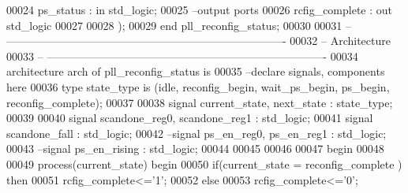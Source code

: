 \begin{DoxyCode}
00024           \textcolor{vhdlchar}{ps_status}             \textcolor{vhdlchar}{:} \textcolor{keywordflow}{in} \textcolor{comment}{std\_logic};
00025 \textcolor{keyword}{        --output ports        }
00026           \textcolor{vhdlchar}{rcfig_complete}        \textcolor{vhdlchar}{:} \textcolor{keywordflow}{out} \textcolor{comment}{std\_logic}
00027           
00028         \textcolor{vhdlchar}{)};
00029 \textcolor{keywordflow}{end} \textcolor{vhdlchar}{pll\_reconfig\_status};
00030 
00031 \textcolor{keyword}{-- ----------------------------------------------------------------------------}
00032 \textcolor{keyword}{-- Architecture}
00033 \textcolor{keyword}{-- ----------------------------------------------------------------------------}
00034 \textcolor{keywordflow}{architecture} arch \textcolor{keywordflow}{of} pll_reconfig_status is
00035 \textcolor{keyword}{--declare signals,  components here}
00036 \textcolor{keywordflow}{type} \textcolor{vhdlchar}{state_type} \textcolor{keywordflow}{is} \textcolor{vhdlchar}{(}\textcolor{vhdlchar}{idle}\textcolor{vhdlchar}{,} \textcolor{vhdlchar}{reconfig\_begin}\textcolor{vhdlchar}{,} \textcolor{vhdlchar}{wait\_ps\_begin}\textcolor{vhdlchar}{,} \textcolor{vhdlchar}{ps\_begin}\textcolor{vhdlchar}{,} \textcolor{vhdlchar}{reconfig\_complete}\textcolor{vhdlchar}{)};
00037 
00038 \textcolor{keywordflow}{signal} \textcolor{vhdlchar}{current_state}\textcolor{vhdlchar}{,} \textcolor{vhdlchar}{next_state} \textcolor{vhdlchar}{:} \textcolor{vhdlchar}{state_type};
00039 
00040 \textcolor{keywordflow}{signal} \textcolor{vhdlchar}{scandone_reg0}\textcolor{vhdlchar}{,} \textcolor{vhdlchar}{scandone_reg1} \textcolor{vhdlchar}{:} \textcolor{comment}{std\_logic};
00041 \textcolor{keywordflow}{signal} \textcolor{vhdlchar}{scandone_fall}    \textcolor{vhdlchar}{:} \textcolor{comment}{std\_logic};
00042 \textcolor{keyword}{--signal ps\_en\_reg0, ps\_en\_reg1 : std\_logic;}
00043 \textcolor{keyword}{--signal ps\_en\_rising   : std\_logic;}
00044 
00045 
00046   
00047 \textcolor{vhdlkeyword}{begin}
00048 
00049 \textcolor{keywordflow}{process}(current_state) \textcolor{keywordflow}{begin}
00050     \textcolor{keywordflow}{if}\textcolor{vhdlchar}{(}\textcolor{vhdlchar}{current_state} \textcolor{vhdlchar}{=} \textcolor{vhdlchar}{reconfig\_complete} \textcolor{vhdlchar}{)} \textcolor{keywordflow}{then}
00051         \textcolor{vhdlchar}{rcfig_complete}\textcolor{vhdlchar}{<=}\textcolor{vhdlchar}{'}\textcolor{vhdllogic}{}\textcolor{vhdllogic}{1}\textcolor{vhdlchar}{'};
00052     \textcolor{keywordflow}{else}
00053         \textcolor{vhdlchar}{rcfig_complete}\textcolor{vhdlchar}{<=}\textcolor{vhdlchar}{'}\textcolor{vhdllogic}{}\textcolor{vhdllogic}{0}\textcolor{vhdlchar}{'};

\end{DoxyCode}
